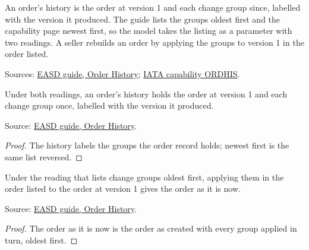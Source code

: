 \begin{definition}
  \label{def:order-creation-history}
  An order's history is the order at version 1 and each change group since,
  labelled with the version it produced.  The guide lists the groups oldest
  first and the capability page newest first, so the model takes the listing
  as a parameter with two readings.  A seller rebuilds an order by applying
  the groups to version 1 in the order listed.

  Sources: \href{https://standards.atlassian.net/wiki/spaces/EASD/pages/574652557/Order+History}{EASD guide, Order History};
  \href{https://retailing.iata.org/armi/docs/ORDHIS/}{IATA capability ORDHIS}.
\end{definition}

\begin{theorem}
  \label{thm:order-creation-history-lists-groups}
  Under both readings, an order's history holds the order at version 1 and
  each change group once, labelled with the version it produced.

  Source: \href{https://standards.atlassian.net/wiki/spaces/EASD/pages/574652557/Order+History}{EASD guide, Order History}.
\end{theorem}
\begin{proof}
  The history labels the groups the order record holds; newest first is the
  same list reversed.
\end{proof}

\begin{theorem}
  \label{thm:order-creation-history-oldest-first}
  Under the reading that lists change groups oldest first, applying them in
  the order listed to the order at version 1 gives the order as it is now.

  Source: \href{https://standards.atlassian.net/wiki/spaces/EASD/pages/574652557/Order+History}{EASD guide, Order History}.
\end{theorem}
\begin{proof}
  The order as it is now is the order as created with every group applied in
  turn, oldest first.
\end{proof}

